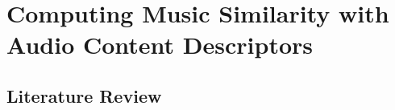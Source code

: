 \chapter{Computing Music Similarity with Audio Content Descriptors} 

\label{Chapter3} 


\section{Literature Review}